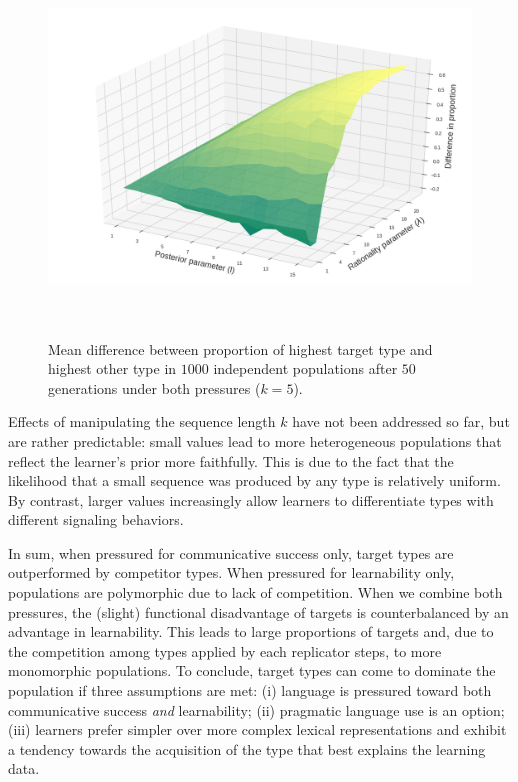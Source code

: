 \documentclass[a4paper, 11pt]{article}
\theoremstyle{Satz}
\begin{document}
\begin{figure}[t]
\centering
\includegraphics[width=1\textwidth,height=10cm,keepaspectratio]{./plots/fig6} %
\caption{Mean difference between proportion of highest target type and highest other type in
  $1000$ independent populations after $50$ generations under both pressures ($k = 5$).}
\label{fig:diff}
\end{figure}

Effects of manipulating the sequence length $k$ have not been addressed so far, but are rather
predictable: small values lead to more heterogeneous populations that reflect the learner's
prior more faithfully. This is due to the fact that the likelihood that a small sequence was
produced by any type is relatively uniform. By contrast, larger values increasingly allow
learners to differentiate types with different signaling behaviors.

In sum, when pressured for communicative success only, target types are outperformed by
competitor types. When pressured for learnability only, populations are polymorphic due to lack
of competition. When we combine both pressures, the (slight) functional disadvantage of targets
is counterbalanced by an advantage in learnability. This leads to large proportions of targets
and, due to the competition among types applied by each replicator steps, to more monomorphic
populations. To conclude, target types can come to dominate the population if three assumptions
are met: (i) language is pressured toward both communicative success {\em and} learnability;
(ii) pragmatic language use is an option; (iii) learners prefer simpler over more complex
lexical representations and exhibit a tendency towards the acquisition of the type that best
explains the learning data.
\end{document}
